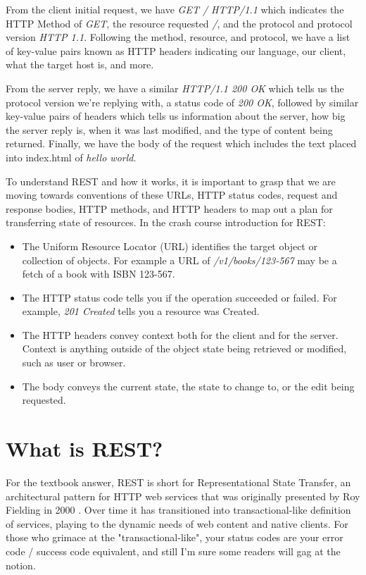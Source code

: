 From the client initial request, we have \textit{GET / HTTP/1.1} which indicates the HTTP Method of \textit{GET}, the resource requested \textit{/}, and the protocol and protocol version \textit{HTTP 1.1}.  Following the method, resource, and protocol, we have a list of key-value pairs known as HTTP headers indicating our language, our client, what the target host is, and more.

From the server reply, we have a similar \textit{HTTP/1.1 200 OK} which tells us the protocol version we're replying with, a status code of \textit{200 OK}, followed by similar key-value pairs of headers which tells us information about the server, how big the server reply is, when it was last modified, and the type of content being returned.  Finally, we have the body of the request which includes the text placed into index.html of \textit{hello world}.

To understand REST and how it works, it is important to grasp that we are moving towards conventions of these URLs, HTTP status codes, request and response bodies, HTTP methods, and HTTP headers to map out a plan for transferring state of resources.  In the crash course introduction for REST:
\begin{itemize}
  \item The Uniform Resource Locator (URL) identifies the target object or collection of objects.  For example a URL of \textit{/v1/books/123-567} may be a fetch of a book with ISBN 123-567.
  \item The HTTP status code tells you if the operation succeeded or failed.  For example, \textit{201 Created} tells you a resource was Created.
  \item The HTTP headers convey context both for the client and for the server.  Context is anything outside of the object state being retrieved or modified, such as user or browser.
  \item The body conveys the current state, the state to change to, or the edit being requested.
\end{itemize}

\section{What is REST?}

For the textbook answer, REST is short for Representational State Transfer, an architectural pattern for HTTP web services that was originally presented by Roy Fielding in 2000 \cite{fielding}.  Over time it has transitioned into transactional-like definition of services, playing to the dynamic needs of web content and native clients.  For those who grimace at the "transactional-like", your status codes are your error code / success code equivalent, and still I'm sure some readers will gag at the notion.

